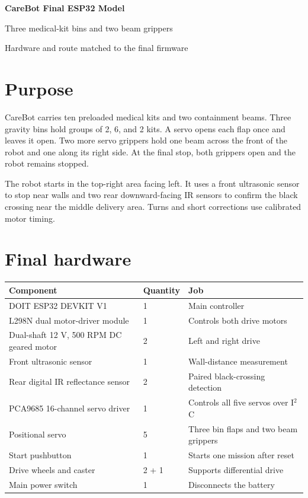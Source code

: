 \documentclass[10pt]{article}
\begin{document}
\begin{center}
  {\color{caregreen}\LARGE\bfseries CareBot Final ESP32 Model}\par
  \vspace{3pt}
  {\large Three medical-kit bins and two beam grippers}\par
  \vspace{2pt}
  {\color{caregray}\small Hardware and route matched to the final firmware}\par
\end{center}

\section*{Purpose}

CareBot carries ten preloaded medical kits and two containment beams. Three gravity bins hold groups of 2, 6, and 2 kits. A servo opens each flap once and leaves it open. Two more servo grippers hold one beam across the front of the robot and one along its right side. At the final stop, both grippers open and the robot remains stopped.

The robot starts in the top-right area facing left. It uses a front ultrasonic sensor to stop near walls and two rear downward-facing IR sensors to confirm the black crossing near the middle delivery area. Turns and short corrections use calibrated motor timing.

\section*{Final hardware}

\renewcommand{\arraystretch}{1.1}
\begin{tabular}{@{}p{}p{}p{}@{}}
\toprule
Component & Quantity & Job \\
\midrule
DOIT ESP32 DEVKIT V1 & 1 & Main controller \\
L298N dual motor-driver module & 1 & Controls both drive motors \\
Dual-shaft 12 V, 500 RPM DC geared motor & 2 & Left and right drive \\
Front ultrasonic sensor & 1 & Wall-distance measurement \\
Rear digital IR reflectance sensor & 2 & Paired black-crossing detection \\
PCA9685 16-channel servo driver & 1 & Controls all five servos over I$^2$C \\
Positional servo & 5 & Three bin flaps and two beam grippers \\
Start pushbutton & 1 & Starts one mission after reset \\
Drive wheels and caster & 2 + 1 & Supports differential drive \\
Main power switch & 1 & Disconnects the battery \\
\bottomrule
\end{tabular}
\end{document}
